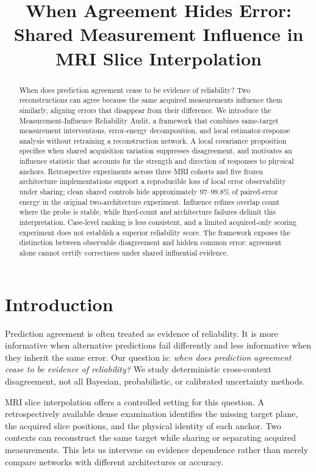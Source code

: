 \documentclass[10pt,twocolumn,letterpaper]{article}
\title{When Agreement Hides Error:\\
Shared Measurement Influence in MRI Slice Interpolation}
\begin{document}
\maketitle

\begin{abstract}
When does prediction agreement cease to be evidence of reliability? Two reconstructions can agree because the same acquired measurements influence them similarly, aligning errors that disappear from their difference. We introduce the Measurement-Influence Reliability Audit, a framework that combines same-target measurement interventions, error-energy decomposition, and local estimator-response analysis without retraining a reconstruction network. A local covariance proposition specifies when shared acquisition variation suppresses disagreement, and motivates an influence statistic that accounts for the strength and direction of responses to physical anchors. Retrospective experiments across three MRI cohorts and five frozen architecture implementations support a reproducible loss of local error observability under sharing; clean shared controls hide approximately 97--99.8\% of paired-error energy in the original two-architecture experiment. Influence refines overlap count where the probe is stable, while fixed-count and architecture failures delimit this interpretation. Case-level ranking is less consistent, and a limited acquired-only scoring experiment does not establish a superior reliability score. The framework exposes the distinction between observable disagreement and hidden common error: agreement alone cannot certify correctness under shared influential evidence.
\end{abstract}

\section{Introduction}
Prediction agreement is often treated as evidence of reliability. It is more informative when alternative predictions fail differently and less informative when they inherit the same error. Our question is: \emph{when does prediction agreement cease to be evidence of reliability?} We study deterministic cross-context disagreement, not all Bayesian, probabilistic, or calibrated uncertainty methods.

MRI slice interpolation offers a controlled setting for this question. A retrospectively available dense examination identifies the missing target plane, the acquired slice positions, and the physical identity of each anchor. Two contexts can reconstruct the same target while sharing or separating acquired measurements. This lets us intervene on evidence dependence rather than merely compare networks with different architectures or accuracy.
\end{document}
